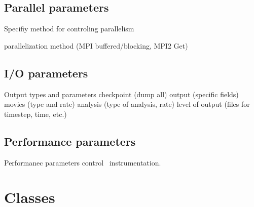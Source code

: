 \documentclass{article}
\begin{document}
\subsection{Parallel parameters}  \label{ss:parallel}

Specifiy method for controling parallelism

   parallelization method (MPI buffered/blocking, MPI2 Get)


\subsection{I/O parameters} 

Output types and parameters
 checkpoint (dump all)
 output (specific fields)
 movies (type and rate)
 analysis (type of analysis, rate)
 level of output (files for timestep, time, etc.)


\subsection{Performance parameters} 

Performanec parameters control \lcaperf\ instrumentation.



\section{Classes} \label{s:classes}
\end{document}
